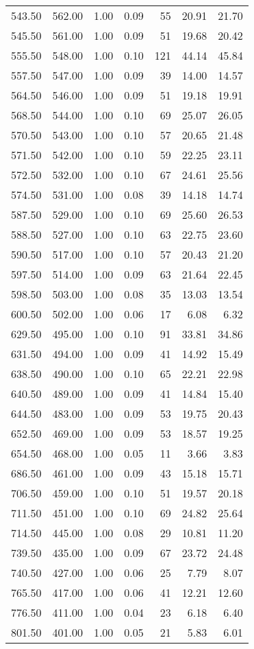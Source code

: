 \begin{table}
\begin{tabular}{rrrrrrr}
543.50 & 562.00 & 1.00 & 0.09 & 55 & 20.91 & 21.70 \\
545.50 & 561.00 & 1.00 & 0.09 & 51 & 19.68 & 20.42 \\
555.50 & 548.00 & 1.00 & 0.10 & 121 & 44.14 & 45.84 \\
557.50 & 547.00 & 1.00 & 0.09 & 39 & 14.00 & 14.57 \\
564.50 & 546.00 & 1.00 & 0.09 & 51 & 19.18 & 19.91 \\
568.50 & 544.00 & 1.00 & 0.10 & 69 & 25.07 & 26.05 \\
570.50 & 543.00 & 1.00 & 0.10 & 57 & 20.65 & 21.48 \\
571.50 & 542.00 & 1.00 & 0.10 & 59 & 22.25 & 23.11 \\
572.50 & 532.00 & 1.00 & 0.10 & 67 & 24.61 & 25.56 \\
574.50 & 531.00 & 1.00 & 0.08 & 39 & 14.18 & 14.74 \\
587.50 & 529.00 & 1.00 & 0.10 & 69 & 25.60 & 26.53 \\
588.50 & 527.00 & 1.00 & 0.10 & 63 & 22.75 & 23.60 \\
590.50 & 517.00 & 1.00 & 0.10 & 57 & 20.43 & 21.20 \\
597.50 & 514.00 & 1.00 & 0.09 & 63 & 21.64 & 22.45 \\
598.50 & 503.00 & 1.00 & 0.08 & 35 & 13.03 & 13.54 \\
600.50 & 502.00 & 1.00 & 0.06 & 17 & 6.08 & 6.32 \\
629.50 & 495.00 & 1.00 & 0.10 & 91 & 33.81 & 34.86 \\
631.50 & 494.00 & 1.00 & 0.09 & 41 & 14.92 & 15.49 \\
638.50 & 490.00 & 1.00 & 0.10 & 65 & 22.21 & 22.98 \\
640.50 & 489.00 & 1.00 & 0.09 & 41 & 14.84 & 15.40 \\
644.50 & 483.00 & 1.00 & 0.09 & 53 & 19.75 & 20.43 \\
652.50 & 469.00 & 1.00 & 0.09 & 53 & 18.57 & 19.25 \\
654.50 & 468.00 & 1.00 & 0.05 & 11 & 3.66 & 3.83 \\
686.50 & 461.00 & 1.00 & 0.09 & 43 & 15.18 & 15.71 \\
706.50 & 459.00 & 1.00 & 0.10 & 51 & 19.57 & 20.18 \\
711.50 & 451.00 & 1.00 & 0.10 & 69 & 24.82 & 25.64 \\
714.50 & 445.00 & 1.00 & 0.08 & 29 & 10.81 & 11.20 \\
739.50 & 435.00 & 1.00 & 0.09 & 67 & 23.72 & 24.48 \\
740.50 & 427.00 & 1.00 & 0.06 & 25 & 7.79 & 8.07 \\
765.50 & 417.00 & 1.00 & 0.06 & 41 & 12.21 & 12.60 \\
776.50 & 411.00 & 1.00 & 0.04 & 23 & 6.18 & 6.40 \\
801.50 & 401.00 & 1.00 & 0.05 & 21 & 5.83 & 6.01 \\
\bottomrule
\end{tabular}
\end{table}
